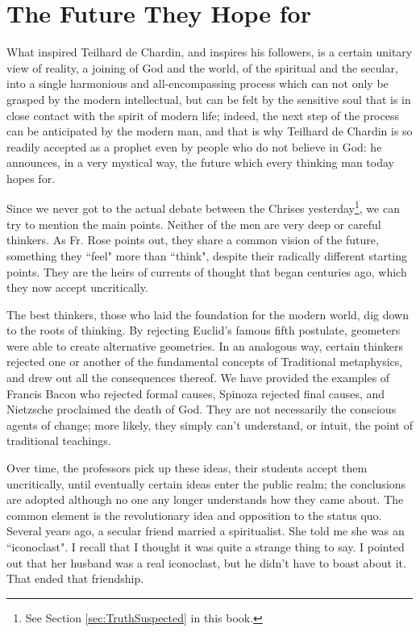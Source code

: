 \section{The Future They Hope for}

\begin{quotex}

What inspired Teilhard de Chardin, and inspires his followers, is a certain unitary view of reality, a joining of God and the world, of the spiritual and the secular, into a single harmonious and all-encompassing process which can not only be grasped by the modern intellectual, but can be felt by the sensitive soul that is in close contact with the spirit of modern life; indeed, the next step of the process can be anticipated by the modern man, and that is why Teilhard de Chardin is so readily accepted as a prophet even by people who do not believe in God: he announces, in a very mystical way, the future which every thinking man today hopes for. 

\end{quotex}
Since we never got to the actual debate between the Chrises yesterday\footnote{See Section \ref{sec:TruthSuspected} in this book.}, we can try to mention the main points. Neither of the men are very deep or careful thinkers. As Fr. Rose points out, they share a common vision of the future, something they ``feel" more than ``think", despite their radically different starting points. They are the heirs of currents of thought that began centuries ago, which they now accept uncritically.

The best thinkers, those who laid the foundation for the modern world, dig down to the roots of thinking. By rejecting Euclid's famous fifth postulate, geometers were able to create alternative geometries. In an analogous way, certain thinkers rejected one or another of the fundamental concepts of Traditional metaphysics, and drew out all the consequences thereof. We have provided the examples of Francis Bacon who rejected formal causes, Spinoza rejected final causes, and Nietzsche proclaimed the death of God. They are not necessarily the conscious agents of change; more likely, they simply can't understand, or intuit, the point of traditional teachings.

Over time, the professors pick up these ideas, their students accept them uncritically, until eventually certain ideas enter the public realm; the conclusions are adopted although no one any longer understands how they came about. The common element is the revolutionary idea and opposition to the status quo. Several years ago, a secular friend married a spiritualist. She told me she was an ``iconoclast". I recall that I thought it was quite a strange thing to say. I pointed out that her husband was a real iconoclast, but he didn't have to boast about it. That ended that friendship.

